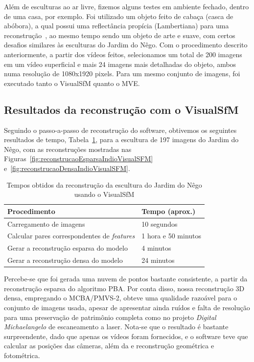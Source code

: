 Além de esculturas ao ar livre, fizemos alguns testes em ambiente fechado,
dentro de uma casa, por exemplo. Foi utilizado um objeto feito de cabaça (casca
de abóbora), a qual possui uma reflectância propícia
(Lambertiana) para uma reconstrução~\cite{basri2003lambertian}, ao mesmo tempo
sendo um objeto de arte e suave, com certos desafios similares às esculturas do
Jardim do Nêgo.  Com o procedimento descrito anteriormente, a partir dos vídeos
feitos, selecionamos um total de 200 imagens em um vídeo superficial e mais 24
imagens mais detalhadas do objeto, ambos numa resolução de 1080x1920 pixels. 
Para um mesmo conjunto de imagens, foi executado tanto o VisualSfM quanto o MVE.

\subsection{Resultados da reconstrução com o VisualSfM}

Seguindo o passo-a-passo de reconstrução do software, obtivemos os seguintes
resultados de tempo, Tabela~\ref{tab:temposSfMJardimDoNego}, para a escultura de
197 imagens do Jardim do Nêgo, com as reconstruções mostradas nas
Figuras~\ref{fig:reconstrucaoEsparsaIndioVisualSFM} e~\ref{fig:reconstrucaoDensaIndioVisualSFM}.

\begin{table}[h!]
\caption{Tempos obtidos da reconstrução da escultura do Jardim do Nêgo usando o VisualSfM}
\label{tab:temposSfMJardimDoNego}
\begin{tabular}{|l|p{4.7cm}|}
\hline
Procedimento & Tempo (aprox.) \\ \hline
Carregamento de imagens & 10 segundos \\ \hline
Calcular pares correspondentes de \emph{features} & 1 hora e 50 minutos \\ \hline
Gerar a reconstrução esparsa do modelo & 4 minutos \\ \hline
Gerar a reconstrução densa do modelo & 24 minutos \\ \hline
\end{tabular}
\end{table}

Percebe-se que foi gerada uma nuvem de pontos bastante consistente, a partir da
reconstrução esparsa do algoritmo PBA.  Por conta disso, nossa reconstrução 3D
densa, empregando o MCBA/PMVS-2, obteve uma qualidade razoável para o conjunto de
imagens usada, apesar de apresentar ainda ruídos e falta de resolução para uma
preservação de patrimônio completa como no projeto \emph{Digital Michaelangelo}
de escaneamento a laser. Nota-se que o resultado é bastante surpreendente, dado que
apenas os vídeos foram fornecidos, e o software teve que calcular as posições
das câmeras, além da e reconstrução geométrica e fotométrica.

